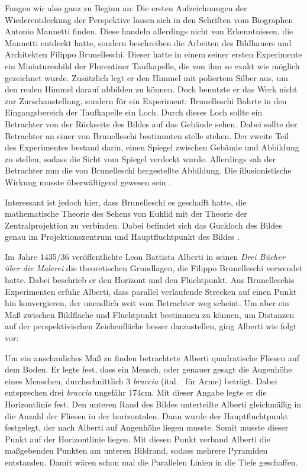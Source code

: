 \documentclass[12pt,a4paper]{article}
\begin{document}
Fangen wir also ganz zu Beginn an: Die ersten Aufzeichnungen der Wiederentdeckung der Perspektive lassen sich in den Schriften vom Biographen Antonio Mannetti finden. Diese handeln allerdings nicht von Erkenntnissen, die Mannetti entdeckt hatte, sondern beschreiben die Arbeiten des Bildhauers und Architekten Filippo Brunelleschi. Dieser hatte in einem seiner ersten Experimente ein Miniaturenbild der Florentiner Taufkapelle, die von ihm so exakt wie möglich gezeichnet wurde. Zusätzlich legt er den Himmel mit poliertem Silber aus, um den realen Himmel darauf abbilden zu können. Doch benutzte er das Werk nicht zur Zurschaustellung, sondern für ein Experiment: Brunelleschi Bohrte in den Eingangsbereich der Taufkapelle ein Loch. Durch dieses Loch sollte ein Betrachter von der Rückseite des Bildes auf das Gebäude sehen. Dabei sollte der Betrachter an einer von Brunelleschi bestimmten stelle stehen. Der zweite Teil des Experimentes bestand darin, einen Spiegel zwischen Gebäude und Abbildung zu stellen, sodass die Sicht vom Spiegel verdeckt wurde. Allerdings sah der Betrachter nun die von Brunelleschi hergestellte Abbildung. Die illusionistische Wirkung musste überwältigend gewesen sein \citep[S.~28f]{perspektive}.

Interessant ist jedoch hier, dass Brunelleschi es geschafft hatte, die mathematische Theorie des Sehens von Euklid mit der Theorie der Zentralprojektion zu verbinden. Dabei befindet sich das Guckloch des Bildes genau im Projektionszentrum und Hauptfluchtpunkt des Bildes \citep[S.~30]{perspektive}.

Im Jahre 1435/36 veröffentlichte Leon Battista Alberti in seinen \textit{Drei Bücher über die Malerei} die theoretischen Grundlagen, die Filippo Brunelleschi verwendet hatte. Dabei beschrieb er den Horizont und den Fluchtpunkt. Aus Brunelleschis Experimenten erfuhr Alberti, dass parallel verlaufende Strecken auf einen Punkt hin konvergieren, der unendlich weit vom Betrachter weg scheint. Um aber ein Maß zwischen Bildfläche und Fluchtpunkt bestimmen zu können, um Distanzen auf der perspektivischen Zeichenfläche besser darzustellen, ging Alberti wie folgt vor:

Um ein anschauliches Maß zu finden betrachtete Alberti quadratische Fliesen auf dem Boden. Er legte fest, dass ein Mensch, oder genauer gesagt die Augenhöhe eines Menschen, durchschnittlich 3 \textit{braccia} (ital.~ für \glqq Arme\grqq) beträgt. Dabei entsprechen drei \textit{braccia} ungefähr 174cm. Mit dieser Angabe legte er die Horizontlinie fest. Den unteren Rand des Bildes unterteilte Alberti gleichmäßig in die Anzahl der Fliesen in der horizontalen. Dann wurde der Hauptfluchtpunkt festgelegt, der nach Alberti auf Augenhöhe liegen musste. Somit musste dieser Punkt auf der Horizontlinie liegen. Mit diesen Punkt verband Alberti die maßgebenden Punkten am unteren Bildrand, sodass mehrere Pyramiden entstanden. Damit wären schon mal die Parallelen Linien in die Tiefe geschaffen.
\end{document}
